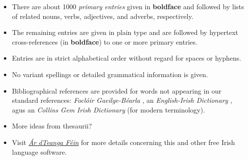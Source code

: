 \begin{itemize}
\item There are about 1000 {\em primary entries} given in {\bf boldface}
and followed by lists of related nouns, verbs, adjectives, and
adverbs, respectively.  
\vspace{2ex}
\item The remaining entries are given in plain type and are followed by 
hypertext cross-references (in {\bf boldface}) to one or more primary entries.
\vspace{2ex}
\item Entries are in strict alphabetical order without regard for
spaces or hyphens.
\vspace{2ex}
\item No variant spellings or detailed grammatical information is given.
\vspace{2ex}
\item Bibliographical references are provided for words not
appearing in our standard references: 
{\it Focl\'oir Gaeilge-B\'earla} \cite{OD77}, 
an {\it English-Irish Dictionary} \cite{Ba59},
agus an {\it Collins Gem Irish Dictionary} \cite{Gem95} 
(for modern terminology).
\vspace{2ex}
\item More ideas from thesaurii?
\vspace{2ex}
\item Visit \href{http://borel.slu.edu/AdTF/index-en.html}{{\it \'Ar dTeanga F\'ein}} 
for more details concerning this and other free Irish language software.
\end{itemize}
\endinput
